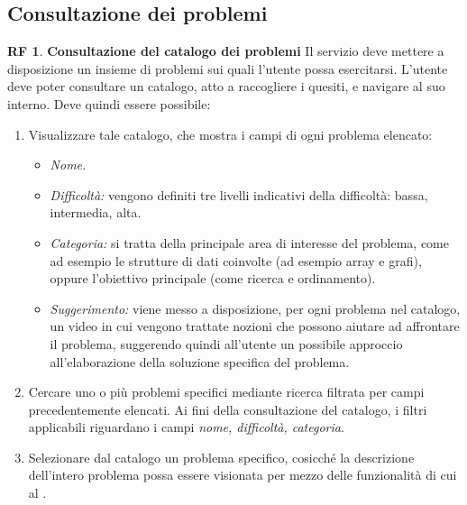 \documentclass[11pt, a4paper]{article}
\theoremstyle{definition}
\newtheorem{funcreq}{RF} %
\begin{document}
\subsection{Consultazione dei problemi}

\begin{funcreq}
\label{probcatalogue}
\textbf{Consultazione del catalogo dei problemi }
Il servizio deve mettere a disposizione un insieme di problemi sui quali
l'utente possa esercitarsi. L'utente deve poter consultare un catalogo,
atto a raccogliere i quesiti, e navigare al suo interno. Deve quindi
essere possibile:
\begin{enumerate}
    \item Visualizzare tale catalogo, che mostra i campi di ogni problema
    elencato:
    \begin{itemize}
        \item \textit{Nome.}
        
        \item \textit{Difficoltà:} vengono definiti tre livelli indicativi
        della difficoltà: bassa, intermedia, alta.
        
        \item \textit{Categoria:} si tratta della principale area di interesse
        del problema, come ad esempio le strutture di dati coinvolte
        (ad esempio array e grafi), oppure l'obiettivo principale (come ricerca
        e ordinamento).

        \item \textit{Suggerimento:} viene messo a disposizione, per ogni
        problema nel catalogo, un video in cui vengono trattate nozioni che
        possono aiutare ad affrontare il problema, suggerendo quindi all'utente un
        possibile approccio all'elaborazione della soluzione specifica del
        problema.
    \end{itemize}
    
    \item Cercare uno o più problemi specifici mediante ricerca filtrata per campi
    precedentemente elencati.
    Ai fini della consultazione del catalogo, i filtri applicabili riguardano i
    campi \textit{nome, difficoltà, categoria}.

    \item Selezionare dal catalogo un problema specifico, cosicché la
    descrizione dell'intero problema possa essere visionata per mezzo
    delle funzionalità di cui al \textcolor{blue}{}.
\end{enumerate}
\end{funcreq}
\end{document}
